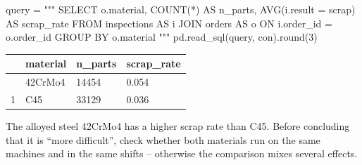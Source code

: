 \documentclass[
  letterpaper,
  DIV=11,
  numbers=noendperiod]{scrreprt}
\newenvironment{Shaded}{\begin{snugshade}}{\end{snugshade}}
\newcommand{\BuiltInTok}[1]{\textcolor[rgb]{0.00,0.23,0.31}{#1}}
\newcommand{\DecValTok}[1]{\textcolor[rgb]{0.68,0.00,0.00}{#1}}
\newcommand{\NormalTok}[1]{\textcolor[rgb]{0.00,0.23,0.31}{#1}}
\newcommand{\OperatorTok}[1]{\textcolor[rgb]{0.37,0.37,0.37}{#1}}
\newcommand{\StringTok}[1]{\textcolor[rgb]{0.13,0.47,0.30}{#1}}
\begin{document}
\begin{tcolorbox}[enhanced jigsaw, left=2mm, title=\textcolor{quarto-callout-caution-color}{\faFire}\hspace{0.5em}{Solution to Exercise 1}, opacityback=0, breakable, rightrule=.15mm, arc=.35mm, toptitle=1mm, colbacktitle=quarto-callout-caution-color!10!white, opacitybacktitle=0.6, coltitle=black, colframe=quarto-callout-caution-color-frame, bottomrule=.15mm, leftrule=.75mm, bottomtitle=1mm, titlerule=0mm, toprule=.15mm, colback=white]

\begin{Shaded}
\begin{Highlighting}[]
\NormalTok{query }\OperatorTok{=} \StringTok{"""}
\StringTok{SELECT o.material, COUNT(*) AS n\_parts, AVG(i.result = \textquotesingle{}scrap\textquotesingle{}) AS scrap\_rate}
\StringTok{FROM inspections AS i}
\StringTok{JOIN orders AS o ON i.order\_id = o.order\_id}
\StringTok{GROUP BY o.material}
\StringTok{"""}
\NormalTok{pd.read\_sql(query, con).}\BuiltInTok{round}\NormalTok{(}\DecValTok{3}\NormalTok{)}
\end{Highlighting}
\end{Shaded}

\begin{longtable}[]{@{}llll@{}}
\toprule\noalign{}
& material & n\_parts & scrap\_rate \\
\midrule\noalign{}
\endhead
\bottomrule\noalign{}
\endlastfoot
0 & 42CrMo4 & 14454 & 0.054 \\
1 & C45 & 33129 & 0.036 \\
\end{longtable}

The alloyed steel 42CrMo4 has a higher scrap rate than C45. Before
concluding that it is ``more difficult'', check whether both materials
run on the same machines and in the same shifts -- otherwise the
comparison mixes several effects.

\end{tcolorbox}
\end{document}
